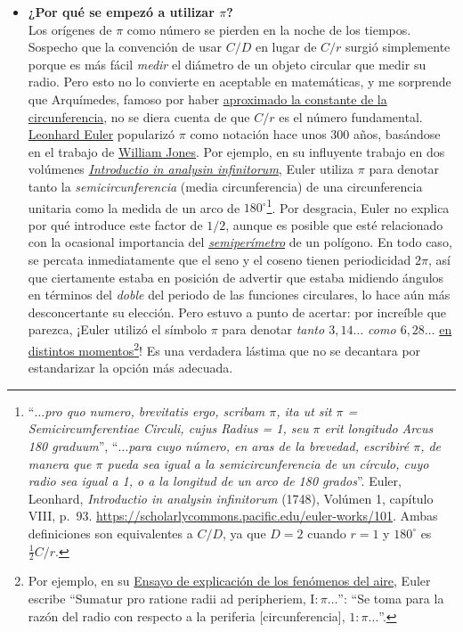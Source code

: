 \begin{itemize}
  \item \textbf{¿Por qué se empezó a utilizar $\pi$?} \\ Los orígenes de $\pi$ como número se pierden en la noche de los tiempos. Sospecho que la convención de usar $C/D$ en lugar de $C/r$ surgió simplemente porque es más fácil \emph{medir} el diámetro de un objeto circular que medir su radio. Pero esto no lo convierte en aceptable en matemáticas, y me sorprende que Arquímedes, famoso por haber \href{http://itech.fgcu.edu/faculty/clindsey/mhf4404/archimedes/archimedes.html}{aproximado la constante de la circunferencia}, no se diera cuenta de que $C/r$ es el número fundamental. \href{https://es.wikipedia.org/wiki/Leonhard_Euler}{Leonhard Euler} popularizó $\pi$ como notación hace unos 300 años, basándose en el trabajo de \href{https://es.wikipedia.org/wiki/William_Jones_(matemático)}{William Jones}. Por ejemplo, en su influyente trabajo en dos volúmenes \href{https://es.wikipedia.org/wiki/Introductio_in_analysin_infinitorum}{\emph{Introductio in analysin infinitorum}}, Euler utiliza $\pi$ para denotar tanto la \emph{semicircunferencia} (media circunferencia) de una circunferencia unitaria como la medida de un arco de $180^\circ$\footnote{``\emph{$\ldots$pro quo numero, brevitatis ergo, scribam $\pi$, ita ut sit $\pi$ = Semicircumferentiae Circuli, cujus Radius = 1, seu $\pi$ erit longitudo Arcus 180 graduum}'', ``\emph{$\ldots$para cuyo número, en aras de la brevedad, escribiré $\pi$, de manera que $\pi$ pueda sea igual a la semicircunferencia de un círculo, cuyo radio sea igual a 1, o a la longitud de un arco de 180 grados}''. Euler, Leonhard, \emph{Introductio in analysin infinitorum} (1748), Volúmen 1, capítulo VIII, p.~93. \href{https://scholarlycommons.pacific.edu/euler-works/101}{https://scholarlycommons.pacific.edu/euler-works/101}. Ambas definiciones son equivalentes a $C/D$, ya que $D=2$ cuando $r=1$ y $180^\circ$ es $\frac{1}{2}C/r$.}. Por desgracia, Euler no explica por qué introduce este factor de $1/2$, aunque es posible que esté relacionado con la ocasional importancia del \href{https://es.wikipedia.org/wiki/Semiper%C3%ADmetro}{\emph{semiperímetro}} de un polígono. En todo caso, se percata inmediatamente que el seno y el coseno tienen periodicidad $2\pi$, así que ciertamente estaba en posición de advertir que estaba midiendo ángulos en términos del \emph{doble} del periodo de las funciones circulares, lo hace aún más desconcertante su elección. Pero estuvo a punto de acertar: por increíble que parezca, ¡Euler utilizó el símbolo $\pi$ para denotar \emph{tanto $3,14\ldots$ como $6,28\ldots$} \href{https://en.wikipedia.org/wiki/Pi#Adoption_of_the_symbol_%CF%80}{en distintos momentos}\footnote{Por ejemplo, en su \href{http://eulerarchive.maa.org/docs/originals/E007.pdf#page=5}{Ensayo de explicación de los fenómenos del aire}, Euler escribe ``Sumatur pro ratione radii ad peripheriem, $\mathrm{I} : \pi\ldots$'': ``Se toma para la razón del radio con respecto a la periferia [circunferencia], $1: \pi\ldots$''.}! Es una verdadera lástima que no se decantara por estandarizar la opción más adecuada.


\end{itemize}
